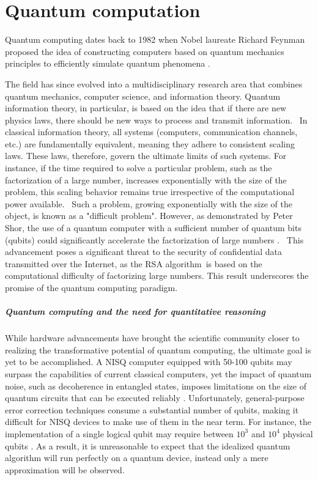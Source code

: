\chapter{Quantum computation}\label{ch:qc}

Quantum computing dates back to 1982 when Nobel laureate Richard Feynman proposed the idea of constructing computers based on quantum mechanics principles to efficiently simulate quantum phenomena \cite{feynman2018simulating}. 

The field has since evolved into a multidisciplinary research area that combines quantum mechanics, computer science, and information theory. Quantum information theory, in particular, is based on the idea that if there are new physics laws, there should be new ways to process and transmit information.  In classical information theory, all systems (computers, communication channels, etc.) are fundamentally equivalent, meaning they adhere to consistent scaling laws. These laws, therefore, govern the ultimate limits of such systems. For instance, if the time required to solve a particular problem, such as the factorization of a large number, increases exponentially with the size of the problem, this scaling behavior remains true irrespective of the computational power available.  Such a problem, growing exponentially with the size of the object, is known as a "difficult problem". However, as demonstrated by Peter Shor, the use of a quantum computer with a sufficient number of quantum bits (qubits) could significantly accelerate the factorization of large numbers \cite{shor1994algorithms}.  This advancement poses a significant threat to the security of confidential data transmitted over the Internet, as the RSA algorithm is based on the computational difficulty of factorizing large numbers. This result underscores the promise of the quantum computing paradigm.


\paragraph{Quantum computing and the need for quantitative reasoning}
While hardware advancements have brought the scientific community closer to realizing the transformative potential of quantum computing, the ultimate goal is yet to be accomplished. A NISQ computer equipped with 50-100 qubits may surpass the capabilities of current classical computers, yet the impact of quantum noise, such as decoherence in entangled states, imposes limitations on the size of quantum circuits that can be executed reliably \cite{preskill2018quantum}. Unfortunately, general-purpose error correction techniques \cite{calderbank1996good, gottesman1997stabilizer, steane1996error} consume a substantial number of qubits, making it difficult for NISQ devices to make use of them in the near term. For instance, the implementation of a single logical qubit may require between $10^3$ and $10^4$ physical qubits \cite{fowler2012surface}. As a result, it is unreasonable to expect that the idealized quantum algorithm will run perfectly on a quantum device, instead
only a mere approximation will be observed.

